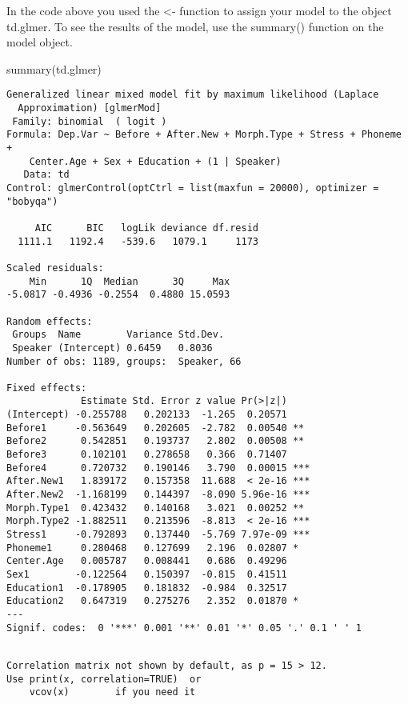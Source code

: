 \documentclass[
  10pt,
  letterpaper]{article}
\newenvironment{Shaded}{\begin{snugshade}}{\end{snugshade}}
\newcommand{\FunctionTok}[1]{\textcolor[rgb]{0.28,0.35,0.67}{#1}}
\newcommand{\NormalTok}[1]{\textcolor[rgb]{0.00,0.23,0.31}{#1}}
\renewcommand\texttt[1]{{\ttfamily\color{BrickRed}#1}}
\begin{document}
In the code above you used the \texttt{\textless{}-} function to assign
your model to the object \texttt{td.glmer}. To see the results of the
model, use the \texttt{summary()} function on the model object.

\begin{Shaded}
\begin{Highlighting}[]
\FunctionTok{summary}\NormalTok{(td.glmer)}
\end{Highlighting}
\end{Shaded}

\begin{verbatim}
Generalized linear mixed model fit by maximum likelihood (Laplace
  Approximation) [glmerMod]
 Family: binomial  ( logit )
Formula: Dep.Var ~ Before + After.New + Morph.Type + Stress + Phoneme +  
    Center.Age + Sex + Education + (1 | Speaker)
   Data: td
Control: glmerControl(optCtrl = list(maxfun = 20000), optimizer = "bobyqa")

     AIC      BIC   logLik deviance df.resid 
  1111.1   1192.4   -539.6   1079.1     1173 

Scaled residuals: 
    Min      1Q  Median      3Q     Max 
-5.0817 -0.4936 -0.2554  0.4880 15.0593 

Random effects:
 Groups  Name        Variance Std.Dev.
 Speaker (Intercept) 0.6459   0.8036  
Number of obs: 1189, groups:  Speaker, 66

Fixed effects:
             Estimate Std. Error z value Pr(>|z|)    
(Intercept) -0.255788   0.202133  -1.265  0.20571    
Before1     -0.563649   0.202605  -2.782  0.00540 ** 
Before2      0.542851   0.193737   2.802  0.00508 ** 
Before3      0.102101   0.278658   0.366  0.71407    
Before4      0.720732   0.190146   3.790  0.00015 ***
After.New1   1.839172   0.157358  11.688  < 2e-16 ***
After.New2  -1.168199   0.144397  -8.090 5.96e-16 ***
Morph.Type1  0.423432   0.140168   3.021  0.00252 ** 
Morph.Type2 -1.882511   0.213596  -8.813  < 2e-16 ***
Stress1     -0.792893   0.137440  -5.769 7.97e-09 ***
Phoneme1     0.280468   0.127699   2.196  0.02807 *  
Center.Age   0.005787   0.008441   0.686  0.49296    
Sex1        -0.122564   0.150397  -0.815  0.41511    
Education1  -0.178905   0.181832  -0.984  0.32517    
Education2   0.647319   0.275276   2.352  0.01870 *  
---
Signif. codes:  0 '***' 0.001 '**' 0.01 '*' 0.05 '.' 0.1 ' ' 1
\end{verbatim}

\begin{verbatim}

Correlation matrix not shown by default, as p = 15 > 12.
Use print(x, correlation=TRUE)  or
    vcov(x)        if you need it
\end{verbatim}
\end{document}
